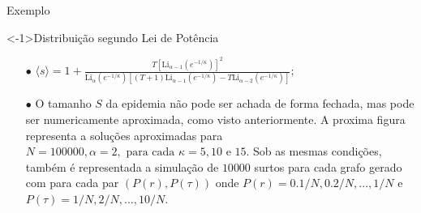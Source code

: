 \documentclass{beamer}
\begin{document}
\begin{frame}{Exemplo}
\begin{exampleblock}
    <-1>{Distribuição segundo Lei de Potência}
    \begin{itemize}

        \item[$\bullet$] 
            $\langle s \rangle = 1  + \frac{ T [\mathrm{Li} _{\alpha-1} ( e ^{-1/\kappa})]^2}{ 
            \mathrm{Li}_\alpha (e^{-1/\kappa})[ (T+1) \mathrm{Li}  _{\alpha- 1} (  e ^{-1/\kappa})
            - T \mathrm{Li}  _{\alpha-2} (  e ^{-1/\kappa})]}; $

        \item[$\bullet$] 
            O tamanho $S$ da epidemia não pode ser achada de forma fechada, mas pode ser numericamente 
            aproximada, como visto anteriormente. A proxima figura representa a soluções aproximadas 
            para  $N = 100 000, \alpha = 2, \text{ para cada } \kappa = 5, 10 \text{ e } 15$. 
            Sob as mesmas condições, também é representada a simulação de $10 000$ surtos para cada 
            grafo gerado com para cada par $(P(r), P(\tau))$ onde $ P(r) = 0.1/N, 0.2/N, ..., 1/N$ e 
            $P(\tau) = 1/N, 2/N, ..., 10/N$. 

    \end{itemize}
    
\end{exampleblock}

\end{frame}




\end{document}
